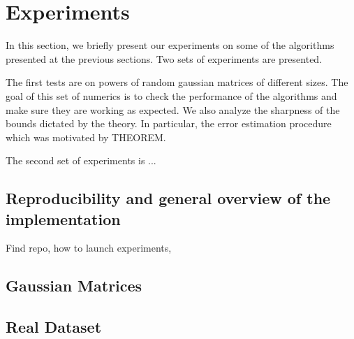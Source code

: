 \section*{Experiments}
In this section, we briefly present our experiments on some of the 
algorithms presented at the previous sections. Two sets of experiments are presented.

The first tests are on powers
of random gaussian matrices of different sizes. The goal of this set of numerics
is to check the performance of the algorithms and make sure they are working
as expected. We also analyze the sharpness of the bounds dictated by the theory.
In particular, the error estimation procedure which was motivated by THEOREM.

The second set of experiments is ...

\subsection*{Reproducibility and general overview of the implementation}
Find repo, how to launch experiments, 
\subsection*{Gaussian Matrices}
\subsection*{Real Dataset}
